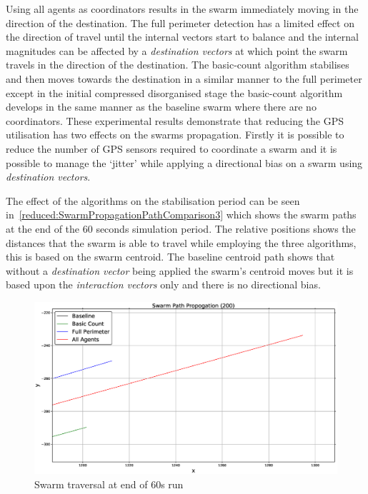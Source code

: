 Using all agents as coordinators results in the swarm immediately moving in the direction of the destination. The full perimeter detection has a limited effect on the direction of travel until the internal vectors start to balance and the internal magnitudes can be affected by a \textit{destination vectors} at which point the swarm travels in the direction of the destination. The basic-count algorithm stabilises and then moves towards the destination in a similar manner to the full perimeter except in the initial compressed disorganised stage the basic-count algorithm develops in the same manner as the baseline swarm where there are no coordinators. These experimental results demonstrate that reducing the GPS utilisation has two effects on the swarms propagation. Firstly it is possible to reduce the number of GPS sensors required to coordinate a swarm and it is possible to manage the `jitter' while applying a directional bias on a swarm using \textit{destination vectors}. 

The effect of the algorithms on the stabilisation period can be seen in~\autoref{reduced:SwarmPropagationPathComparison3} which shows the swarm paths at the end of the 60 seconds simulation period. The relative positions shows the distances that the swarm is able to travel while employing the three algorithms, this is based on the swarm centroid. The baseline centroid path shows that without a \textit{destination vector} being applied the swarm's centroid moves but it is based upon the \textit{interaction vectors} only and there is no directional bias.

\begin{figure}[H]
\begin{center}
\includegraphics[width=14cm]{CHAPTER-6/figures/SwarmPropagationComparison3}
\end{center}
\caption{Swarm traversal at end of 60s run\label{reduced:SwarmPropagationPathComparison3}}
\end{figure}

